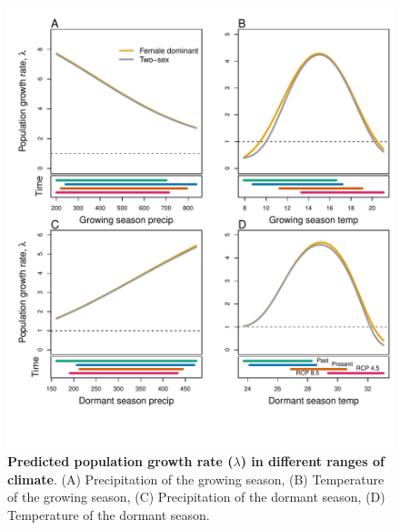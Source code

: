 \documentclass[12pt]{article}\usepackage[]{graphicx}\usepackage[dvipsnames]{xcolor}
\begin{document}

\begin{figure}[H]
	\begin{center}
		\includegraphics[width=1\linewidth]{Figures/lambda_past_present_future.pdf}
		\caption{\textbf{Predicted population growth rate ($\lambda$) in different ranges of climate}.
			(A) Precipitation of the growing season, (B) Temperature of the growing season, (C) Precipitation of the dormant season, (D) Temperature of the dormant season.
}
\end{center}
\end{figure}
\end{document}
